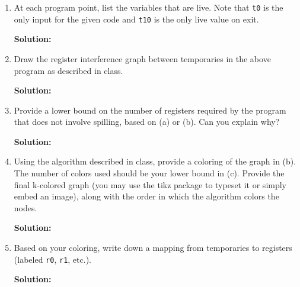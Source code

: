 \documentclass[11pt]{article}
\begin{document}
\begin{enumerate}
\begin{enumerate}
    \item At each program point, list the variables that are live. Note that \texttt{t0} is the only input for the given code and \texttt{t10} is the only live value on exit.

    \textbf{Solution:}


    \item Draw the register interference graph between temporaries in the above program as described in class.

    \textbf{Solution:}

    \item Provide a lower bound on the number of registers required by the program that does not involve spilling, based on (a) or (b). Can you explain why?

    \textbf{Solution:}

  \item Using the algorithm described in class, provide a coloring of the graph in (b).
    The number of colors used should be your lower bound in (c).
    Provide the final k-colored graph (you may use the tikz package to typeset it or simply embed an image),
    along with the order in which the algorithm colors the nodes.

    \textbf{Solution:}
    \item Based on your coloring, write down a mapping from temporaries to registers (labeled {\tt r0}, {\tt r1}, etc.).

    \textbf{Solution:} 
      
\end{enumerate}

\end{enumerate}
\end{document}
